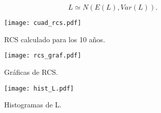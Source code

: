 \documentclass{article}
\begin{document}
\begin{equation*}
    L \simeq N(E(L), Var(L)).
\end{equation*}
\begin{figure}[H]
    \centering
    \texttt{[image: cuad\_rcs.pdf]}
    \caption{RCS calculado para los 10 años.}
\end{figure}
\begin{figure}[H]
    \centering
    \texttt{[image: rcs\_graf.pdf]}
    \caption{Gráficas de RCS.}
\end{figure}
\newpage
\begin{figure}[H]
    \centering
    \texttt{[image: hist\_L.pdf]}
    \caption{Histogramas de L.}
\end{figure}
\end{document}
